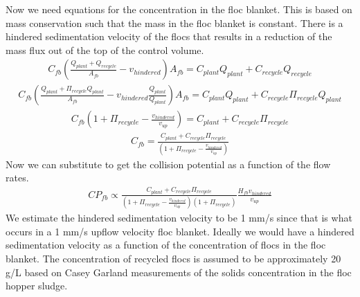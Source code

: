 \documentclass[letterpaper,10pt,english]{sphinxmanual}
\begin{document}
{\begin{equation}
\end{equation}
Now we need equations for the concentration in the floc blanket. This is based on mass conservation such that the mass in the floc blanket is constant. There is a hindered sedimentation velocity of the flocs that results in a reduction of the mass flux out of the top of the control volume.
\begin{equation}\label{equation:Sedimentation/Sed_Theory_and_Future_Work:Sedimentation/Sed_Theory_and_Future_Work:6}
\begin{split}C_{fb}\left(\frac{ Q_{plant}+Q_{recycle} }{A_{fb}}-v_{hindered}\right) A_{fb}= C_{plant}Q_{plant} + C_{recycle}Q_{recycle}\end{split}
\end{equation}\begin{equation}\label{equation:Sedimentation/Sed_Theory_and_Future_Work:Sedimentation/Sed_Theory_and_Future_Work:7}
\begin{split}C_{fb}\left(\frac{ Q_{plant}+\Pi_{recycle}Q_{plant} }{A_{fb}}-v_{hindered}\frac{Q_{plant}}{Q_{plant}}\right) A_{fb}= C_{plant}Q_{plant} + C_{recycle}\Pi_{recycle}Q_{plant}\end{split}
\end{equation}\begin{equation}\label{equation:Sedimentation/Sed_Theory_and_Future_Work:Sedimentation/Sed_Theory_and_Future_Work:8}
\begin{split}C_{fb}\left( 1+\Pi_{recycle} -\frac{v_{hindered}}{v_{up}}\right) = C_{plant} + C_{recycle}\Pi_{recycle}\end{split}
\end{equation}\begin{equation}\label{equation:Sedimentation/Sed_Theory_and_Future_Work:Sedimentation/Sed_Theory_and_Future_Work:9}
\begin{split}C_{fb} = \frac{C_{plant} + C_{recycle}\Pi_{recycle}}{\left(1+\Pi_{recycle}-\frac{v_{hindered}}{v_{up}}\right)}\end{split}
\end{equation}
Now we can substitute to get the collision potential as a function of the flow rates.
\begin{equation}\label{equation:Sedimentation/Sed_Theory_and_Future_Work:Sedimentation/Sed_Theory_and_Future_Work:10}
\begin{split}CP_{fb} \propto \frac{C_{plant} + C_{recycle}\Pi_{recycle}}{\left(1+\Pi_{recycle}-\frac{v_{hindered}}{v_{up}}\right)\left( 1 + \Pi_{recycle} \right)}  \frac{H_{fb}v_{hindered}} {v_{up}}\end{split}
\end{equation}
We estimate the hindered sedimentation velocity to be 1 mm/s since that is what occurs in a 1 mm/s upflow velocity floc blanket. Ideally we would have a hindered sedimentation velocity as a function of the concentration of flocs in the floc blanket. The concentration of recycled flocs is assumed to be approximately 20 g/L based on Casey Garland measurements of the solids concentration in the floc hopper sludge.

}
\end{document}
